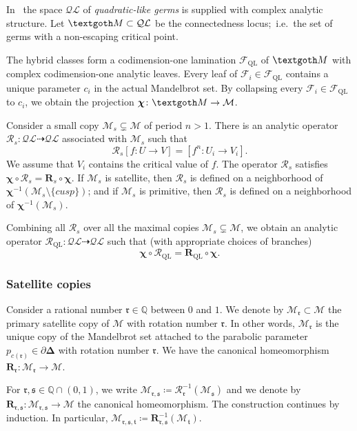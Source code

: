 \documentclass{amsart}
\newcommand{\1}{{\mathbb 1 }}
\newcommand{\Mandel}{{\mathcal{M}}}
\newcommand\HH{\boldsymbol{\Delta}}%
\newcommand\RR{\mathcal{R}}
\newcommand\mRR{\boldsymbol R}%
\renewcommand{\tt}{\mathfrak{t}}
\newcommand{\rr}{\mathfrak{r}}
\renewcommand{\ss}{\mathfrak{s}}
\newcommand\strai{{\boldsymbol \chi}}
\newcommand{\Q}{\mathbb{Q}}
\newcommand{\Fol}{{\mathcal F}}
\newcommand{\bFol}{{\boldsymbol{ \mathcal F}}}
\theoremstyle{remark}
\numberwithin{equation}{section}
\theoremstyle{definition}
\def\QL{{\text{QL}}}
\newcommand{\QG}{{\mathcal {QL}}}
\newcommand{\Conn}{{\textgoth M}}
\theoremstyle{nonumberbreak}
\begin{document}
In~\cite{L:FCT} the space $\QG$ of \emph{quadratic-like germs} is supplied with complex analytic structure. Let $\Conn\subset \QG$ be the connectedness locus;~i.e.~the set of germs with a non-escaping critical point.  

 The hybrid classes form a codimension-one lamination $\bFol_\QL$ of $\Conn$ with complex codimension-one analytic leaves. Every leaf of $\Fol_i\in \bFol_\QL$ contains a unique parameter $c_i $ in the actual Mandelbrot set. By collapsing every $\Fol_i\in \bFol_\QL$ to $c_i$, we obtain the projection $\strai\colon \Conn\to \Mandel$.



Consider a small copy $\Mandel_s \subsetneq \Mandel$ of period $n>1$. There is an analytic operator $\RR_s\colon \QG\dashrightarrow \QG$ associated with $\Mandel_s$ such that
\[\RR_s [f\colon U\to V] = [f^n\colon U_i\to V_i].\]
We assume that $V_i$ contains the critical value of $f$. The operator $\RR_s$ satisfies $\strai \circ \RR_s=\mRR_s\circ \strai$. If $\Mandel_s$ is satellite, then $\RR_s$ is defined on a neighborhood of $\strai ^{-1}(\Mandel_s\setminus \{cusp\})$; and if $\Mandel_s$ is primitive, then $\RR_s$ is defined on a neighborhood of $\strai ^{-1}(\Mandel_s)$.  

Combining all $\RR_s$ over all the maximal copies $\Mandel_s \subsetneq \Mandel$, we obtain an analytic operator $\RR_\QL\colon \QG\dashrightarrow \QG$ such that (with appropriate choices of branches)
\[\strai \circ \RR_\QL=\mRR_\QL\circ \strai .\]


\subsubsection{Satellite copies}
\label{sss:not:SatCopies}
Consider a rational number $\rr\in \Q$ between $0$ and $1$. We denote by $\Mandel_\rr\subset \Mandel$ the primary satellite copy of $\Mandel$ with rotation number $\rr$. In other words, $\Mandel_\rr$ is the unique copy of the Mandelbrot set attached to the parabolic parameter $p_{c(\rr)}\in \partial \HH$ with rotation number $\rr$. We have the canonical homeomorphism $\mRR_\rr\colon \Mandel_\rr\to \Mandel$. 

For $\rr,\ss \in \Q\cap (0,1)$, we write $\Mandel_{\rr,\ss}\coloneqq \RR_{\rr}^{-1} (\Mandel_\ss )$ and we denote by $\mRR_{\rr,\ss}\colon \Mandel_{\rr,\ss}\to \Mandel$ the canonical homeomorphism. The construction continues by induction. In particular, $\Mandel_{\rr,\ss,\tt}\coloneqq \mRR^{-1}_{\rr,\ss} (\Mandel_\tt)$.
\end{document}
